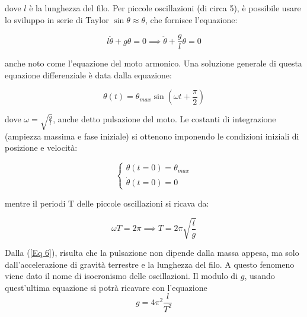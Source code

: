 \documentclass[a4paper]{article}
\begin{document}
dove $l$ è la lunghezza del filo. Per piccole oscillazioni (di circa 5\degree), è possibile usare lo sviluppo in serie di Taylor $\sin\theta \approx \theta$, che fornisce l'equazione:

\begin{equation} \label{Eq 3}
    l\ddot{\theta} + g\theta = 0 \implies \ddot{\theta} + \frac{g}{l}\theta = 0
\end{equation}

anche noto come l'equazione del moto armonico. Una soluzione generale di questa equazione differenziale è data dalla equazione:

\begin{equation} \label{Eq 4}
    \theta(t) = \theta_{max}\sin({\omega t + \frac{\pi}{2}})
\end{equation}

dove $\omega = \sqrt{\frac{g}{l}}$, anche detto pulsazione del moto. Le costanti di integrazione (ampiezza massima e fase iniziale) si ottenono imponendo le condizioni iniziali di posizione e velocità: 

\begin{equation} \label{Eq 5}
    \left\{
        \begin{array}{lr}
            \theta(t=0) = \theta_{max} \\
            \dot{\theta}(t = 0) = 0
        \end{array}
    \right.
\end{equation}

mentre il periodi T delle piccole oscillazioni si ricava da:

\begin{equation} \label{Eq 6}
    \omega T = 2\pi \implies T = 2\pi \sqrt{\frac{l}{g}}
\end{equation}

Dalla (\ref{Eq 6}), risulta che la pulsazione non dipende dalla massa appesa, ma solo dall'accelerazione di gravità terrestre e la lunghezza del filo. A questo fenomeno viene dato il nome di isocronismo delle oscillazioni. Il modulo di $g$, usando quest'ultima equazione si potrà ricavare con l'equazione
\begin{equation}
    g = 4\pi^2 \frac{l}{T^2}
\end{equation}
\end{document}
